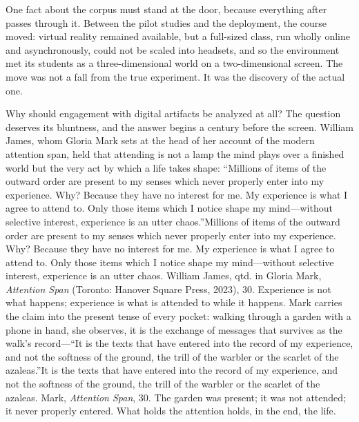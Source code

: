 One fact about the corpus must stand at the door, because everything after passes through it. Between the pilot studies and the deployment, the course moved: virtual reality remained available, but a full-sized class, run wholly online and asynchronously, could not be scaled into headsets, and so the environment met its students as a three-dimensional world on a two-dimensional screen. The move was not a fall from the true experiment. It was the discovery of the actual one.

Why should engagement with digital artifacts be analyzed at all? The question deserves its bluntness, and the answer begins a century before the screen. William James, whom Gloria Mark sets at the head of her account of the modern attention span, held that attending is not a lamp the mind plays over a finished world but the very act by which a life takes shape: ``Millions of items of the outward order are present to my senses which never properly enter into my experience. Why? Because they have no interest for me. My experience is what I agree to attend to. Only those items which I notice shape my mind---without selective interest, experience is an utter chaos.''Millions of items of the outward order are present to my senses which never properly enter into my experience. Why? Because they have no interest for me. My experience is what I agree to attend to. Only those items which I notice shape my mind---without selective interest, experience is an utter chaos. William James, qtd. in Gloria Mark, \textit{Attention Span} (Toronto: Hanover Square Press, 2023), 30. Experience is not what happens; experience is what is attended to while it happens. Mark carries the claim into the present tense of every pocket: walking through a garden with a phone in hand, she observes, it is the exchange of messages that survives as the walk's record---``It is the texts that have entered into the record of my experience, and not the softness of the ground, the trill of the warbler or the scarlet of the azaleas.''It is the texts that have entered into the record of my experience, and not the softness of the ground, the trill of the warbler or the scarlet of the azaleas. Mark, \textit{Attention Span}, 30. The garden was present; it was not attended; it never properly entered. What holds the attention holds, in the end, the life.

